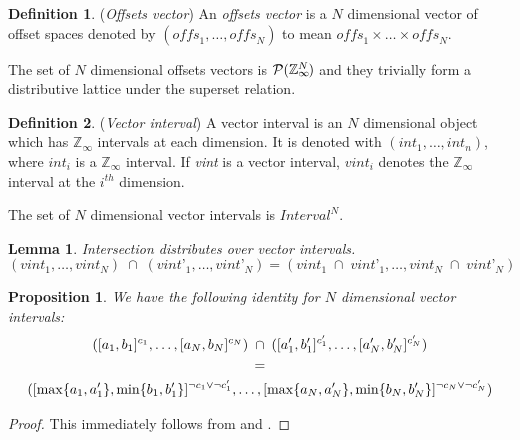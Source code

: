 \documentclass{article}
\theoremstyle{definition}
\newtheorem{defn}{Definition}
\theoremstyle{plain}
\newtheorem{lem}{Lemma}
\newtheorem{prop}{Proposition}
\newcommand{\zinf}{\textnormal{$\mathbb{Z}_\infty$}}
\newcommand{\interv}[3]{\textnormal{$\lbrack#1,#2\rbrack^{#3}$}}
\begin{document}

\begin{defn}{(\emph{Offsets vector})}
  An \emph{offsets vector} is a $N$ dimensional vector of offset spaces denoted
  by $(\textit{offs}_1, \dots, \textit{offs}_N)$ to mean $\textit{offs}_1 \times
  \dots \times \textit{offs}_N$.

  The set of $N$ dimensional offsets vectors is
  $\mathcal{P}{(\zinf{}^{\mkern-19mu{N}})}$ and they trivially form a
  distributive lattice under the superset relation.
\end{defn}

\begin{defn}{(\emph{Vector interval})}
  A vector interval is an $N$ dimensional object which has \zinf{} intervals at
  each dimension. It is denoted with $(\textit{int}_1, \dots, \textit{int}_n)$,
  where $\textit{int}_i$ is a \zinf{} interval. If \textit{vint} is a vector
  interval, $\textit{vint}_i$ denotes the \zinf{} interval at the $i^{th}$
  dimension.

  The set of $N$ dimensional vector intervals is $\textit{Interval}^N$.
\end{defn}

\begin{lem}{}
  Intersection distributes over vector intervals.
%
  \begin{equation*}
    (\textit{vint}_1, \dots, \textit{vint}_N) \;\cap\;
      (\textit{vint'}_1, \dots, \textit{vint'}_N)
      =
    (\textit{vint}_1 \;\cap\; \textit{vint'}_1, \dots,
     \textit{vint}_N \;\cap\; \textit{vint'}_N)
  \end{equation*}\label{lem:vector-dist}
\end{lem}
%
\begin{prop}{}
  We have the following identity for $N$ dimensional vector intervals:
%
  \begin{gather*}
    (\interv{a_1}{b_1}{c_1}, \dots, \interv{a_N}{b_N}{c_N}) \; \cap \;
      (\interv{a'_1}{b'_1}{c'_1}, \dots, \interv{a'_N}{b'_N}{c'_N}) \\
    = \\
    (\interv{\max \{a_1,a'_1\}}{\min \{b_1,b'_1\}}{\neg c_1 \vee \neg c'_1},
      \dots, \interv{\max \{a_N,a'_N\}}{\min \{b_N,b'_N\}}{\neg c_N \vee \neg c'_N})
  \end{gather*}
\end{prop}
%
\begin{proof}
  This immediately follows from  and
  .
\end{proof}
\end{document}
